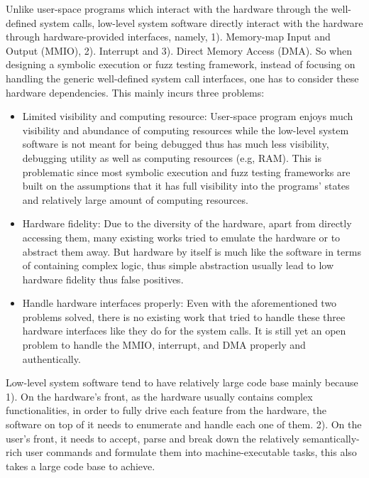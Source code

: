 Unlike user-space programs which interact with the hardware through the well-defined system calls, low-level system software directly interact with the hardware through hardware-provided interfaces, namely, 1). Memory-map Input and Output (MMIO), 2). Interrupt and 3). Direct Memory Access (DMA). 
So when designing a symbolic execution or fuzz testing framework, instead of focusing on handling the generic well-defined system call interfaces, one has to consider these hardware dependencies. 
This mainly incurs three problems: 
\begin{itemize}
    \item Limited visibility and computing resource: 
            User-space program enjoys much visibility and abundance of computing resources while the low-level system software is not meant for being debugged thus has much less visibility, debugging utility as well as computing resources (e.g, RAM). 
            This is problematic since most symbolic execution and fuzz testing frameworks are built on the assumptions that it has full visibility into the programs' states and relatively large amount of computing resources. 
    \item Hardware fidelity: 
            Due to the diversity of the hardware, apart from directly accessing them, many existing works tried to emulate the hardware or to abstract them away. 
            But hardware by itself is much like the software in terms of containing complex logic, thus simple abstraction usually lead to low hardware fidelity thus false positives. 
    \item Handle hardware interfaces properly: 
            Even with the aforementioned two problems solved, there is no existing work that tried to handle these three hardware interfaces like they do for the system calls. 
            It is still yet an open problem to handle the MMIO, interrupt, and DMA properly and authentically.  
\end{itemize}


Low-level system software tend to have relatively large code base mainly because 1). On the hardware's front, as the hardware usually contains complex functionalities, in order to fully drive each feature from the hardware, the software on top of it needs to enumerate and handle each one of them. 2). On the user's front, it needs to accept, parse and break down the relatively semantically-rich user commands and formulate them into machine-executable tasks, this also takes a large code base to achieve.


